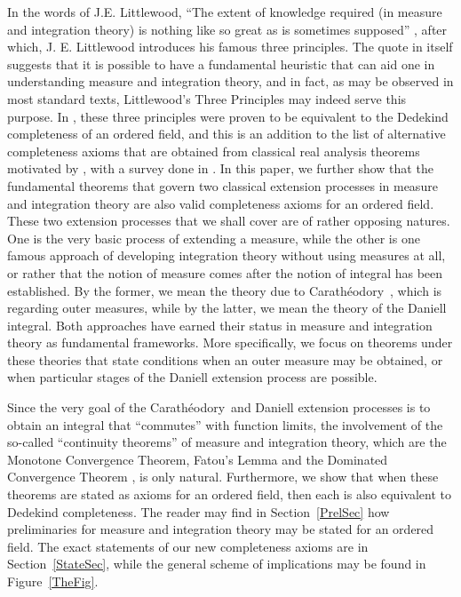 \documentclass[11pt,a4paper]{article}
\def\Cara{Carath\'{e}odory\  }
\begin{document}
In the words of J.E. Littlewood, ``The extent of knowledge required (in measure and integration theory) is nothing like so great as is sometimes supposed'' \cite[p.~26]{lit44}, after which, J. E. Littlewood introduces his famous three principles. The quote in itself suggests that it is possible to have a fundamental heuristic that can aid one in understanding measure and integration theory, and in fact, as may be observed in most standard texts, Littlewood's Three Principles may indeed serve this purpose. In \cite{can24}, these three principles were proven to be equivalent to the Dedekind completeness of an ordered field, and this is an addition to the list of alternative completeness axioms that are obtained from classical real analysis theorems motivated by \cite{pro13,rie01,tei13}, with a survey done in \cite{dev14}. In this paper, we further show that the fundamental theorems that govern two classical extension processes in measure and integration theory are also valid completeness axioms for an ordered field. These two extension processes that we shall cover are of rather opposing natures. One is the very basic process of extending a measure, while the other is one famous approach of developing integration theory without using measures at all, or rather that the notion of measure comes after the notion of integral has been established. By the former, we mean the theory due to \Cara\!\!, which is regarding outer measures, while by the latter, we mean the theory of the Daniell integral. Both approaches have earned their status in measure and integration theory as fundamental frameworks. More specifically, we focus on theorems under these theories that state conditions when an outer measure may be obtained, or when particular stages of the Daniell extension process are possible.

Since the very goal of the \Cara and Daniell extension processes is to obtain an integral that ``commutes'' with function limits, the involvement of the so-called ``continuity theorems'' of measure and integration theory, which are the Monotone Convergence Theorem, Fatou's Lemma and the Dominated Convergence Theorem \cite[p.~179]{sum23}, is only natural. Furthermore, we show that when these theorems are stated as axioms for an ordered field, then each is also equivalent to Dedekind completeness. The reader may find in Section~\ref{PrelSec} how  preliminaries for measure and integration theory may be stated for an ordered field. The exact statements of our new completeness axioms are in Section~\ref{StateSec}, while the general scheme of implications may be found in Figure~\ref{TheFig}.
\end{document}
